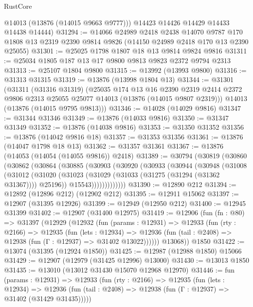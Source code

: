 \begin{lexlean}{RustCore}
\begin{coremodule}
        @14013
        (@13876 (@14015 @9663 @9777)))
      @14423
      @14426
      @14429
      @14433
      @14438
      @14444)
@31294 := @14066
    @24989
    @2418
    @2438
    @14070
    @9787
    @170
    @1808
    @13
    @2319
    @2390
    @9814
    @9826
    (@14150 @24989 @2418 @170 @13 @2390 @25055)
@31301 := @25025 @1798 @1807 @18 @13 @9814 @9824 @9816
@31311 := @25034 @1805 @187 @13 @17 @9800 @9813 @9823 @2372 @9794 @2313
@31313 := @25107 @1804 @9800
@31315 := @13992 (@13993 @9800)
@31316 := @31313 @31315
@31319 := @13876 (@13998 @1804 @13)
@31344 := @31301
    (@31311
      (@31316 @31319)
      (@25035
        @174
        @13
        @16
        @2390
        @2319
        @2414
        @2372
        @9806
        @2313
        @25055
        @25077
        @14013
        (@13876 (@14015 @9807 @2319)))
      @14013
      (@13876 (@14015 @9795 @9813)))
@31346 := @14028 (@14029 @9816)
@31347 := @31344 @31346
@31349 := @13876 (@14033 @9816)
@31350 := @31347 @31349
@31352 := @13876 (@14038 @9816)
@31353 := @31350 @31352
@31356 := @13876 (@14042 @9816 @18)
@31357 := @31353 @31356
@31361 := @13876 (@14047 @1798 @18 @13)
@31362 := @31357 @31361
@31367 := @13876 (@14053 (@14054 (@14055 @9816)) @2418)
@31389 := @30794
    (@30819
      (@30860
        (@30862
          (@30864
            (@30885
              (@30903
                (@30920
                  (@30933
                    (@30944
                      (@30948
                        (@31008
                          (@31012
                            (@31020
                              (@31023 (@31029 (@31033 (@31275 (@31294 (@31362 @31367)))) @25196))
                              @15543)))))))))))))
@31390 := @12890 @212
@31394 := @12892 (@12896 @212) (@12902 @212)
@31395 := @12911 @15062
@31397 := @12907 (@31395 @12926)
@31399 := @12949 (@12950 @212)
@31400 := @12945 @31399
@31402 := @12907 (@31400 @12975)
@31419 := @12906
    (fun (fn : @80) =>
    @31397
      (@12929
        (@12932
          (fun (params : @12931) =>
          @12933
            (fun (rty : @2166) =>
            @12935
              (fun (lets : @12934) =>
              @12936 (fun (tail : @2408) => @12938 (fun (Γ : @12937) => @31402 @13022))))))
        @13068))
    @1850
@31422 := @13074 (@31395 (@12924 @1850))
@31425 := @12987 (@12988 @1850) @15066
@31429 := @12907 (@12979 (@31425 @12996) @13000)
@31430 := @13013 @1850
@31435 := @13010 (@13012 @31430 @15070 @12968 @12970)
@31446 := fun (params : @12931) =>
  @12933
    (fun (rty : @2166) =>
    @12935
      (fun (lets : @12934) =>
      @12936 (fun (tail : @2408) => @12938 (fun (Γ : @12937) => @31402 (@31429 @31435)))))

\end{coremodule}
\end{lexlean}
